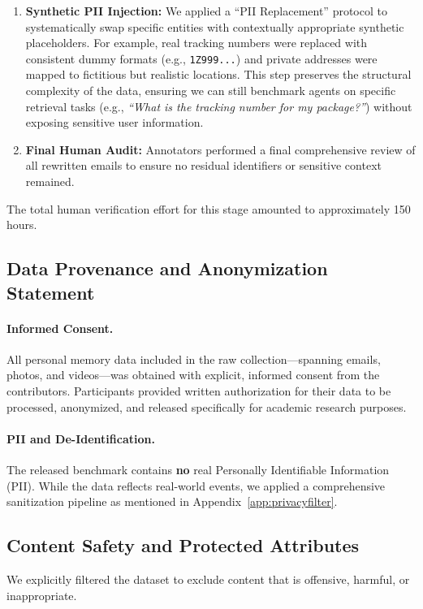 \documentclass{article}
\theoremstyle{plain}
\theoremstyle{definition}
\theoremstyle{remark}
\begin{document}
\begin{enumerate}

\item \textbf{Synthetic PII Injection:} We applied a ``PII Replacement'' protocol to systematically swap specific entities with contextually appropriate synthetic placeholders. For example, real tracking numbers were replaced with consistent dummy formats (e.g., \texttt{1Z999...}) and private addresses were mapped to fictitious but realistic locations. This step preserves the structural complexity of the data, ensuring we can still benchmark agents on specific retrieval tasks (e.g., \textit{``What is the tracking number for my package?''}) without exposing sensitive user information.

\item \textbf{Final Human Audit:} Annotators performed a final comprehensive review of all rewritten emails to ensure no residual identifiers or sensitive context remained. 
\end{enumerate}
The total human verification effort for this stage amounted to approximately 150 hours.

\subsection{Data Provenance and Anonymization Statement}
\paragraph{Informed Consent.}
All personal memory data included in the raw collection—spanning emails, photos, and videos—was obtained with explicit, informed consent from the contributors. Participants provided written authorization for their data to be processed, anonymized, and released specifically for academic research purposes.

\paragraph{PII and De-Identification.}
The released benchmark contains \textbf{no} real Personally Identifiable Information (PII). While the data reflects real-world events, we applied a comprehensive sanitization pipeline as mentioned in Appendix~\ref{app:privacyfilter}.
\subsection{Content Safety and Protected Attributes}
We explicitly filtered the dataset to exclude content that is offensive, harmful, or inappropriate.
\end{document}
